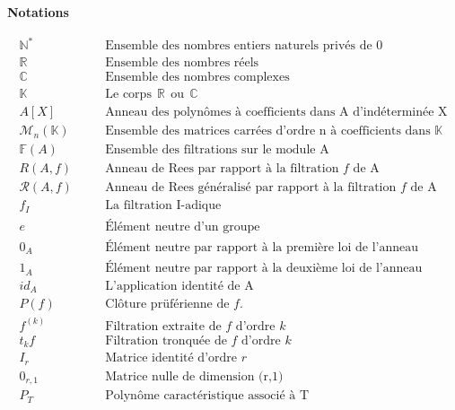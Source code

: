 \newpage

\begin{center}
	\LARGE{\textbf{Notations}}
\end{center}


\begin{eqnarray*}
	\mathbb{N}^* & & \quad \text{Ensemble des nombres entiers naturels privés de 0} \\
	\mathbb{R} & & \quad \text{Ensemble des nombres réels} \\
	\mathbb{C} & & \quad \text{Ensemble des nombres complexes} \\
	\mathbb{K} & & \quad \text{Le  corps} \ \ \mathbb{R} \ \ \text{ou} \ \ \mathbb{C}\\
	A[X] & & \quad \text{Anneau des polynômes à coefficients dans A d'indéterminée X}\\
	\mathcal{M}_n(\mathbb{K}) & & \quad \text{Ensemble des matrices carrées d'ordre n à coefficients dans $\mathbb{K}$}\\
	\mathbb{F}(A) & & \quad \text{Ensemble des filtrations sur le module A}\\
	R(A,f) & & \quad \text{Anneau de Rees par rapport à la filtration $f$ de A}\\
	\mathcal{R}(A,f) & & \quad \text{Anneau de Rees généralisé par rapport à la filtration $f$ de A}\\
	f_{I} & & \quad \text{La filtration I-adique} \\
	e & & \quad \text{Élément neutre d'un groupe} \\
	0_{A} & & \quad \text{Élément neutre par rapport à la première loi de l'anneau} \\
	1_{A} & & \quad \text{Élément neutre par rapport à la deuxième loi de l'anneau} \\
	id_{A} & & \quad \text{L'application identité de A} \\
	P(f) & & \quad \text{Clôture prüférienne de $f$.} \\
	f^{(k)} & & \quad \text{Filtration extraite de $f$ d'ordre $k$} \\
	t_kf & & \quad \text{Filtration tronquée de $f$ d'ordre $k$} \\
	I_{r} & & \quad \text{Matrice identité d'ordre $r$} \\
	0_{r,1} & & \quad \text{Matrice nulle de dimension (r,1)} \\
	P_{T} & & \quad \text{Polynôme caractéristique associé à T} \\
\end{eqnarray*}